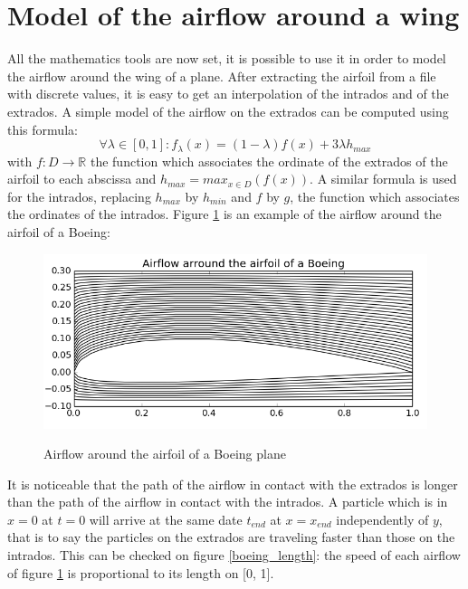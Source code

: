 \documentclass{article}
\begin{document}
\section{Model of the airflow around a wing}

All the mathematics tools are now set, it is possible to use it in order to model the airflow around the wing of a plane. After extracting the airfoil from a file with discrete values, it is easy to get an interpolation of the intrados and of the extrados. A simple model of the airflow on the extrados can be computed using this formula:
\begin{equation}
\forall \lambda \in [0,1]: f_{\lambda}(x) = (1-\lambda)f(x) + 3\lambda h_{max}
\end{equation}
with $f: D \to \mathbb{R}$ the function which associates the ordinate of the extrados of the airfoil to each abscissa and $h_{max} = max_{x \in D}(f(x))$. A similar formula is used for the intrados, replacing $h_{max}$ by $h_{min}$ and $f$ by $g$, the function which associates the ordinates of the intrados. Figure \ref{boeing_airflow} is an example of the airflow around the airfoil of a Boeing:

\begin{figure}[h]
  \centering
  \caption{Airflow around the airfoil of a Boeing plane}
  \includegraphics[width=14cm]{boeing_airflow}
  \label{boeing_airflow}
\end{figure}

\newpage

It is noticeable that the path of the airflow in contact with the extrados is longer than the path of the airflow in contact with the intrados. A particle which is in $x = 0$ at $t = 0$ will arrive at the same date $t_{end}$ at $x = x_{end}$ independently of $y$, that is to say the particles on the extrados are traveling faster than those on the intrados. This can be checked on figure \ref{boeing_length}: the speed of each airflow of figure \ref{boeing_airflow} is proportional to its length on [0, 1].
\end{document}
